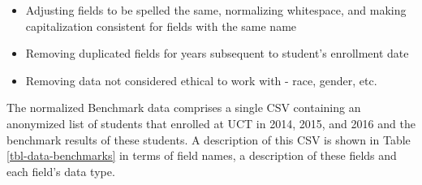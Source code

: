 \begin{itemize}
    \item Adjusting fields to be spelled the same, normalizing whitespace, and making capitalization consistent for fields with the same name
    \item Removing duplicated fields for years subsequent to student's enrollment date
    \item Removing data not considered ethical to work with - race, gender, etc.
\end{itemize}

The normalized Benchmark data comprises a single CSV containing an anonymized list of students that enrolled at UCT in 2014, 2015, and 2016 and the benchmark results of these students. A description of this CSV is shown in Table \ref{tbl-data-benchmarks} in terms of field names, a description of these fields and each field's data type.

